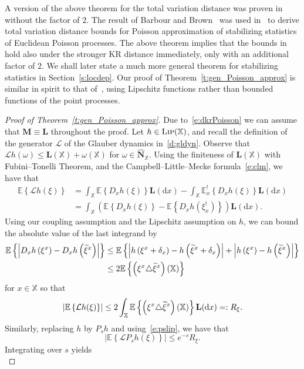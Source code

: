 \documentclass[10pt]{amsart}
\theoremstyle{definition}\newtheorem{defi}[theo]{Definition}\newtheorem{rema}[theo]{Remark}\newtheorem{exam}[theo]{Example}\newtheorem{exem}[theo]{Example}\newtheorem{nota}[theo]{Notation}
\newcommand*\bL{\mathbf{L}}
\newcommand*\bM{\mathbf{M}}
\newcommand*\bN{\mathbf{N}}
\newcommand*\X{\mathbb{X}}
\newcommand{\E}{\mathbb{E}}
\newcommand*\cL{\mathcal{L}}
\newcommand*\txi{\tilde{\xi}}
\newcommand*\cLip{\textsc{Lip}}
\newcommand*\md{\mathrm{d}}
\newcommand{\mean}[1] {\E\left\{{#1}\right\}}
\let\oldtilde\tilde
\renewcommand*{\tilde}[1]{\mathchoice{\widetilde{#1}}{\widetilde{#1}}{\oldtilde{#1}}{\oldtilde{#1}}}
\begin{document}
A version of the above theorem for the total variation distance was proven in~\cite[Theorem~2.6]{Barbour1992} without the factor of $2$. The result of Barbour and Brown~\cite{Barbour1992} was used in~\cite[Theorem~3.3]{Otto2020} to derive total variation distance bounds for Poisson approximation of stabilizing statistics of Euclidean Poisson processes. The above theorem implies that the bounds in~\cite[Theorem~3.3]{Otto2020} hold also under the stronger KR distance immediately, only with an additional factor of $2$. We shall later state a much more general theorem for stabilizing statistics in Section~\ref{s:locdep}. Our proof of Theorem~\ref{t:gen_Poisson_approx} is similar in spirit to that of~\cite[Theorem~2.6]{Barbour1992}, using Lipschitz functions rather than bounded functions of the point processes.


\begin{proof}[Proof of Theorem~\ref{t:gen_Poisson_approx}]
Due to~\eqref{e:dkrPoisson} we can assume that $\bM \equiv \bL$ throughout the proof. Let $h\in \cLip(\X)$, and recall the definition of the generator $\cL$ of the Glauber dynamics in~\eqref{d:gldyn}. Observe that $\cL h(\omega) \leq \bL(\X) + \omega(\X)$ for $\omega \in \widehat{\bN}_{\X}$. Using the finiteness of $\bL(\X)$ with Fubini--Tonelli Theorem, and the Campbell--Little--Mecke formula~\eqref{e:clm}, we have that
\begin{align*}
\mean{\cL h(\xi)} & = \int_{\X} \mean{D_xh(\xi)} \bL(\md x) - \int_{\X} \E^{!}_x\left\{D_xh(\xi)\right\}\bL(\md x) \\ & = \int_{\X} \left(\mean{D_xh(\xi)} - \mean{D_xh\left(\xi^{!}_x\right)} \right) \bL(\md x).
\end{align*}
Using our coupling assumption and the Lipschitz assumption on $h$, we can bound the absolute value of the last integrand by
\begin{align*}
\mean{\left|D_xh\left(\xi^x\right) - D_xh\left(\txi^x\right)\right|} &\leq \mean{\left|h\left(\xi^x + \delta_x\right) - h\left(\txi^x +\delta_x\right)\right| + \left|h\left(\xi^x\right) - h\left(\txi^x\right)\right|}\\
&\leq 2 \mean{\left(\xi^x \triangle \txi^x\right)(\X)}
\end{align*}
for $x\in\X$ so that
\[
\left|\mean{\cL h(\xi)}\right| \leq 2 \int_{\X} \mean{\left(\xi^x \triangle \txi^x\right)(\X)} \bL(\md x) =:R_{\xi}.
\]
Similarly, replacing $h$ by $P_sh$ and using~\eqref{e:pslip}, we have that
\[
\left|\mean{\cL P_sh(\xi)}\right| \leq e^{-s} R_{\xi}.
\]
Integrating over $s$ yields
\begin{equation}\label{e:Lpsh_bd}

\end{equation}
\end{proof}
\end{document}
